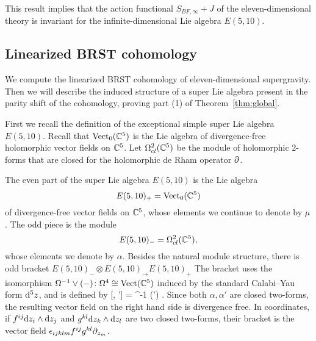This result implies that the action functional $S_{BF, \infty} + J$ of the eleven-dimensional theory is invariant for the infinite-dimensional Lie algebra $E(5,10)$. 




\subsection{Linearized BRST cohomology} 

We compute the linearized BRST cohomology of eleven-dimensional supergravity.
Then we will describe the induced structure of a super Lie algebra present in the parity shift of the cohomology, proving part (1) of Theorem~\ref{thm:global}.

\parsec[]

First we recall the definition of the exceptional simple super Lie algebra $E(5,10)$. 
Recall that ${\rm Vect}_0 (\mathbb C^5)$ is the Lie algebra of divergence-free holomorphic vector fields on $\mathbb C^5$.
Let $\Omega^{2}_{cl} (\mathbb C^5)$ be the module of holomorphic $2$-forms that are closed for the holomorphic de Rham operator $\partial$.

The even part of the super Lie algebra $E(5,10)$ is the Lie algebra
\[
E(5,10)_+ = {\rm Vect}_0(\mathbb C^5)
\]
of divergence-free vector fields on $\mathbb C^5$,
whose elements we continue to denote by $\mu$. 
The odd piece is the module 
\[
E(5,10)_- = \Omega^{2}_{cl} (\mathbb C^5),
\]
whose elements we denote by $\alpha$. 
Besides the natural module structure, there is odd bracket $ E(5,10)_-\otimes E(5,10)_\to E(5,10)_+$
The bracket uses the isomorphism $\Omega^{-1} \vee (-) \colon \Omega^{4} \cong {\rm Vect} (\mathbb C^5)$ induced by the standard Calabi--Yau form ${\rm d}^5 z$, and is defined by
\beqn\label{eqn:e510}
[\alpha, \alpha'] = \Omega^{-1} \vee (\alpha \wedge \alpha') .
\eeqn
Since both $\alpha, \alpha'$ are closed two-forms,  the resulting vector field on the right hand side is divergence free. 
In coordinates, if $f^{ij} {\rm d} z_i \wedge {\rm d} z_j$ and $g^{kl} {\rm d} z_k \wedge {\rm d} z_l$ are two closed two-forms, their bracket is the vector field $\epsilon_{ijklm} f^{ij}g^{kl} \partial_{z_m}$. 

